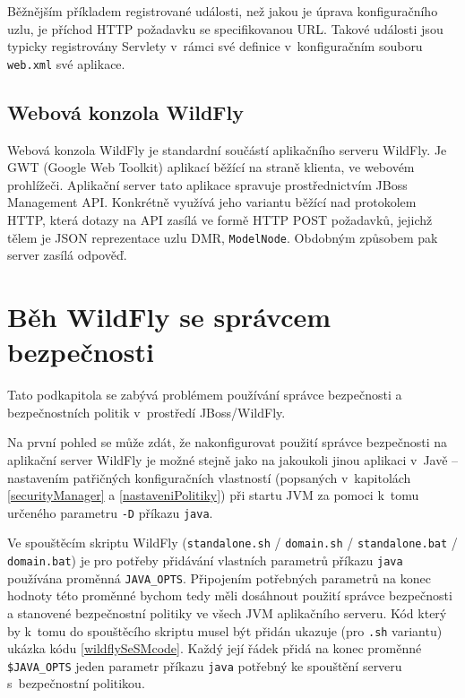 Běžnějším příkladem registrované události, než jakou je úprava konfiguračního uzlu, je příchod HTTP požadavku se specifikovanou URL.
Takové události jsou typicky registrovány Servlety v~rámci své definice v~konfiguračním souboru {\tt web.xml} své aplikace.
\cite{jboss7slideShare}

\subsection{Webová konzola WildFly} \label{hal}

Webová konzola WildFly je standardní součástí aplikačního serveru WildFly.
Je GWT (Google Web Toolkit) aplikací běžící na straně klienta, ve webovém prohlížeči.
Aplikační server tato aplikace spravuje prostřednictvím JBoss Management API.
Konkrétně využívá jeho variantu běžící nad protokolem HTTP, která dotazy na API zasílá ve formě HTTP POST požadavků, jejichž tělem je JSON reprezentace uzlu DMR, {\tt ModelNode}. Obdobným způsobem pak server zasílá odpověď.
\cite{WildFlyManagementAPIreference}

\section{Běh WildFly se správcem bezpečnosti} \label{wildflySeSM}

Tato podkapitola se zabývá problémem používání správce bezpečnosti a bezpečnostních politik v~prostředí JBoss/WildFly.

Na první pohled se může zdát, že nakonfigurovat použití správce bezpečnosti na aplikační server WildFly je možné stejně jako na jakoukoli jinou aplikaci v~Javě -- nastavením patřičných konfiguračních vlastností (popsaných v~kapitolách \ref{securityManager} a \ref{nastaveniPolitiky}) při startu JVM za pomoci k~tomu určeného parametru {\tt -D} příkazu {\tt java}.

Ve spouštěcím skriptu WildFly ({\tt standalone.sh} / {\tt domain.sh} / {\tt standalone.bat} / {\tt domain.bat}) je pro potřeby přidávání vlastních parametrů příkazu {\tt java} používána proměnná {\tt JAVA\_OPTS}.
Připojením potřebných parametrů na konec hodnoty této proměnné bychom tedy měli dosáhnout použití správce bezpečnosti a stanovené bezpečnostní politiky ve všech JVM aplikačního serveru.
Kód který by k~tomu do spouštěcího skriptu musel být přidán ukazuje (pro {\tt *.sh} variantu) ukázka kódu \ref{wildflySeSMcode}.
Každý její řádek přidá na konec proměnné {\tt \$JAVA\_OPTS} jeden parametr příkazu {\tt java} potřebný ke spouštění serveru s~bezpečnostní politikou.
\cite{jbossSecurityManager}

